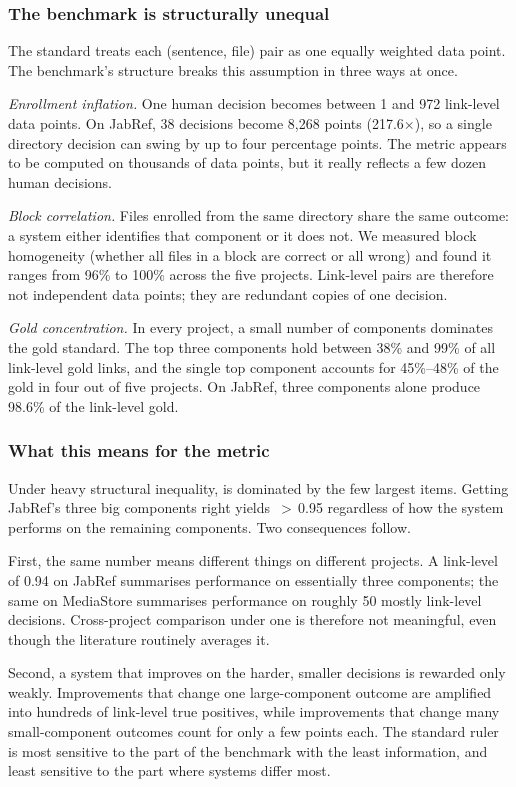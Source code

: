 \subsubsection*{The benchmark is structurally unequal}
The standard \fone treats each (sentence, file) pair as one equally weighted data point.
The benchmark's structure breaks this assumption in three ways at once.

\emph{Enrollment inflation.}
One human decision becomes between 1 and 972 link-level data points.
On JabRef, 38 decisions become 8,268 points (217.6$\times$), so a single directory decision can swing \fone by up to four percentage points.
The metric appears to be computed on thousands of data points, but it really reflects a few dozen human decisions.

\emph{Block correlation.}
Files enrolled from the same directory share the same outcome: a system either identifies that component or it does not.
We measured block homogeneity (whether all files in a block are correct or all wrong) and found it ranges from 96\% to 100\% across the five projects.
Link-level pairs are therefore not independent data points; they are redundant copies of one decision.

\emph{Gold concentration.}
In every project, a small number of components dominates the gold standard.
The top three components hold between 38\% and 99\% of all link-level gold links, and the single top component accounts for 45\%–48\% of the gold in four out of five projects.
On JabRef, three components alone produce 98.6\% of the link-level gold.

\subsubsection*{What this means for the metric}
Under heavy structural inequality, \fone is dominated by the few largest items.
Getting JabRef's three big components right yields \fone\,$>$\,0.95 regardless of how the system performs on the remaining components.
Two consequences follow.

First, the same \fone number means different things on different projects.
A link-level \fone of 0.94 on JabRef summarises performance on essentially three components; the same \fone on MediaStore summarises performance on roughly 50 mostly link-level decisions.
Cross-project comparison under one \fone is therefore not meaningful, even though the literature routinely averages it.

Second, a system that improves on the harder, smaller decisions is rewarded only weakly.
Improvements that change one large-component outcome are amplified into hundreds of link-level true positives, while improvements that change many small-component outcomes count for only a few points each.
The standard ruler is most sensitive to the part of the benchmark with the least information, and least sensitive to the part where systems differ most.

